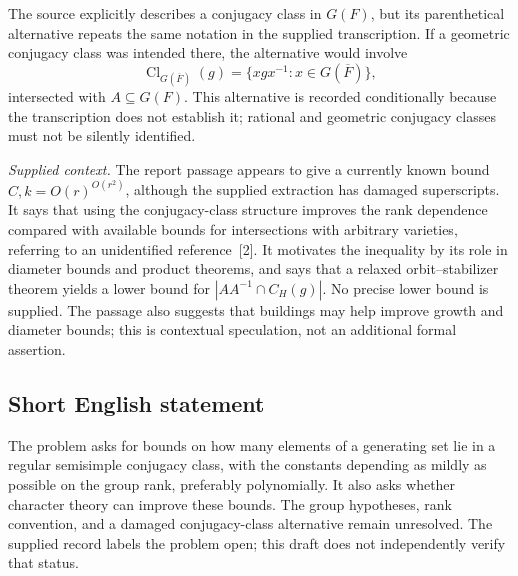 \documentclass[11pt]{article}
\begin{document}
The source explicitly describes a conjugacy class in \(G(F)\), but its parenthetical alternative repeats the same notation in the supplied transcription. If a geometric conjugacy class was intended there, the alternative would involve
\[
\operatorname{Cl}_{G(\overline F)}(g)
=\{xgx^{-1}:x\in G(\overline F)\},
\]
intersected with \(A\subseteq G(F)\). This alternative is recorded conditionally because the transcription does not establish it; rational and geometric conjugacy classes must not be silently identified.

\emph{Supplied context.} The report passage appears to give a currently known bound \(C,k=O(r)^{O(r^2)}\), although the supplied extraction has damaged superscripts. It says that using the conjugacy-class structure improves the rank dependence compared with available bounds for intersections with arbitrary varieties, referring to an unidentified reference~[2]. It motivates the inequality by its role in diameter bounds and product theorems, and says that a relaxed orbit--stabilizer theorem yields a lower bound for \(|AA^{-1}\cap C_H(g)|\). No precise lower bound is supplied. The passage also suggests that buildings may help improve growth and diameter bounds; this is contextual speculation, not an additional formal assertion.
\subsection{Short English statement}
The problem asks for bounds on how many elements of a generating set lie in a regular semisimple conjugacy class, with the constants depending as mildly as possible on the group rank, preferably polynomially. It also asks whether character theory can improve these bounds. The group hypotheses, rank convention, and a damaged conjugacy-class alternative remain unresolved. The supplied record labels the problem open; this draft does not independently verify that status.
\end{document}
